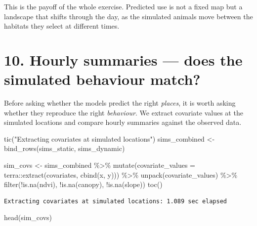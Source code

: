 \documentclass[
  letterpaper,
  DIV=11,
  numbers=noendperiod]{scrartcl}
\newenvironment{Shaded}{\begin{snugshade}}{\end{snugshade}}
\newcommand{\AttributeTok}[1]{\textcolor[rgb]{0.40,0.45,0.13}{#1}}
\newcommand{\FunctionTok}[1]{\textcolor[rgb]{0.28,0.35,0.67}{#1}}
\newcommand{\NormalTok}[1]{\textcolor[rgb]{0.00,0.23,0.31}{#1}}
\newcommand{\OtherTok}[1]{\textcolor[rgb]{0.00,0.23,0.31}{#1}}
\newcommand{\SpecialCharTok}[1]{\textcolor[rgb]{0.37,0.37,0.37}{#1}}
\newcommand{\StringTok}[1]{\textcolor[rgb]{0.13,0.47,0.30}{#1}}
\begin{document}
This is the payoff of the whole exercise. Predicted use is not a fixed
map but a landscape that shifts through the day, as the simulated
animals move between the habitats they select at different times.

\section{10. Hourly summaries --- does the simulated behaviour
match?}\label{hourly-summaries-does-the-simulated-behaviour-match}

Before asking whether the models predict the right \emph{places}, it is
worth asking whether they reproduce the right \emph{behaviour}. We
extract covariate values at the simulated locations and compare hourly
summaries against the observed data.

\begin{Shaded}
\begin{Highlighting}[]
\FunctionTok{tic}\NormalTok{(}\StringTok{"Extracting covariates at simulated locations"}\NormalTok{)}
\NormalTok{sims\_combined }\OtherTok{\textless{}{-}} \FunctionTok{bind\_rows}\NormalTok{(sims\_static, sims\_dynamic)}

\NormalTok{sim\_covs }\OtherTok{\textless{}{-}}\NormalTok{ sims\_combined }\SpecialCharTok{\%\textgreater{}\%}
  \FunctionTok{mutate}\NormalTok{(}\AttributeTok{covariate\_values =}\NormalTok{ terra}\SpecialCharTok{::}\FunctionTok{extract}\NormalTok{(covariates, }\FunctionTok{cbind}\NormalTok{(x, y))) }\SpecialCharTok{\%\textgreater{}\%}
  \FunctionTok{unpack}\NormalTok{(covariate\_values) }\SpecialCharTok{\%\textgreater{}\%}
  \FunctionTok{filter}\NormalTok{(}\SpecialCharTok{!}\FunctionTok{is.na}\NormalTok{(ndvi), }\SpecialCharTok{!}\FunctionTok{is.na}\NormalTok{(canopy), }\SpecialCharTok{!}\FunctionTok{is.na}\NormalTok{(slope))}
\FunctionTok{toc}\NormalTok{()}
\end{Highlighting}
\end{Shaded}

\begin{verbatim}
Extracting covariates at simulated locations: 1.089 sec elapsed
\end{verbatim}

\begin{Shaded}
\begin{Highlighting}[]
\FunctionTok{head}\NormalTok{(sim\_covs)}
\end{Highlighting}
\end{Shaded}
\end{document}
